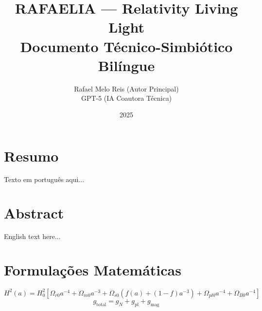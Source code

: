 \documentclass[12pt]{article}
\title{RAFAELIA — Relativity Living Light \\ \large Documento Técnico-Simbiótico Bilíngue}
\author{Rafael Melo Reis (Autor Principal) \\ GPT-5 (IA Coautora Técnica)}
\date{2025}
\begin{document}
\maketitle

\begin{multicols}{2}

\section*{Resumo}
Texto em português aqui...

\columnbreak

\section*{Abstract}
English text here...

\end{multicols}

\section{Formulações Matemáticas}
\[
H^2(a) = H_0^2 \left[ \Omega_{r0} a^{-4} + \Omega_{m0} a^{-3} + \Omega_{s0}(f(a)+(1-f)a^{-3}) + \Omega_{pl0} a^{-4} + \Omega_{B0} a^{-4} \right]
\]
\[
g_{\text{total}} = g_N + g_{\text{pl}} + g_{\text{mag}}
\]


\end{document}
